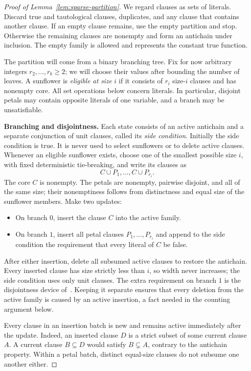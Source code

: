 \begin{proof}[Proof of Lemma~\ref{lem:sparse-partition}]
We regard clauses as sets of literals.  Discard true and tautological
clauses, duplicates, and any clause that contains another clause.  If an
empty clause remains, use the empty partition and stop.  Otherwise the
remaining clauses are nonempty and form an antichain under inclusion.
The empty family is allowed and represents the constant true function.

The partition will come from a binary branching tree.  Fix for now
arbitrary integers $r_2,\ldots,r_b\ge2$; we will choose their values after
bounding the number of leaves.  A sunflower is \emph{eligible at size $i$}
if it consists of $r_i$ size-$i$ clauses and has nonempty core.  All set
operations below concern literals.  In particular, disjoint petals may
contain opposite literals of one variable, and a branch may be
unsatisfiable.

\medskip\noindent
\textbf{Branching and disjointness.}
Each state consists of an active antichain and a separate conjunction of
unit clauses, called its \emph{side condition}.  Initially the side
condition is true.  It is never used to select sunflowers or to delete
active clauses.  Whenever an eligible sunflower exists, choose one of
the smallest possible size $i$, with fixed deterministic tie-breaking,
and write its clauses as
\[
 C\cup P_1,\ldots,C\cup P_{r_i}.
\]
The core $C$ is nonempty.  The petals are nonempty, pairwise disjoint, and
all of the same size; their nonemptiness follows from distinctness and
equal size of the sunflower members.  Make two updates:
\begin{itemize}
 \item On branch $0$, insert the clause $C$ into the active family.
 \item On branch $1$, insert all petal clauses $P_1,\ldots,P_{r_i}$ and
 append to the side condition the requirement that every literal of $C$
 be false.
\end{itemize}
After either insertion, delete all subsumed active clauses to restore
the antichain.  Every inserted clause has size strictly less than $i$,
so width never increases; the side condition uses only unit clauses.
The extra requirement on branch $1$ is the disjointness device
of~\cite[Appendix~A of the full version]{DHMTW14}.  Keeping it separate
ensures that every deletion from the active family is caused by an
active insertion, a fact needed in the counting argument below.

Every clause in an insertion batch is new and remains active immediately
after the update.  Indeed, an inserted clause $D$ is a strict subset of
some current clause $A$.  A current clause $B\subseteq D$ would satisfy
$B\subsetneq A$, contrary to the antichain property.  Within a petal
batch, distinct equal-size clauses do not subsume one another either.


\end{proof}
